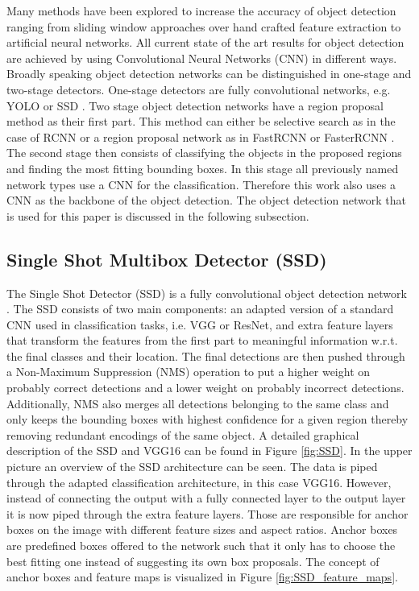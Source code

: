 Many methods have been explored to increase the accuracy of object detection ranging from sliding window approaches over hand crafted feature extraction to artificial neural networks. All current state of the art results for object detection are achieved by using Convolutional Neural Networks (CNN) in different ways. Broadly speaking object detection networks can be distinguished in one-stage and two-stage detectors. One-stage detectors are fully convolutional networks, e.g. YOLO \cite{yolo} or SSD \cite{SSD}. Two stage object detection networks have a region proposal method as their first part. This method can either be selective search as in the case of RCNN \cite{RCNN} or a region proposal network as in FastRCNN \cite{FastRCNN} or FasterRCNN \cite{FasterRCNN}. The second stage then consists of classifying the objects in the proposed regions and finding the most fitting bounding boxes. In this stage all previously named network types use a CNN for the classification. Therefore this work also uses a CNN as the backbone of the object detection. The object detection network that is used for this paper is discussed in the following subsection.

\subsection{Single Shot Multibox Detector (SSD)}

The Single Shot Detector (SSD) is a fully convolutional object detection network \cite{SSD}. The SSD consists of two main components: an adapted version of a standard CNN used in classification tasks, i.e. VGG or ResNet, and extra feature layers that transform the features from the first part to meaningful information w.r.t. the final classes and their location. The final detections are then pushed through a Non-Maximum Suppression (NMS) operation to put a higher weight on probably correct detections and a lower weight on probably incorrect detections. Additionally, NMS also merges all detections belonging to the same class and only keeps the bounding boxes with highest confidence for a given region thereby removing redundant encodings of the same object. 
A detailed graphical description of the SSD and VGG16 can be found in Figure \ref{fig:SSD}. In the upper picture an overview of the SSD architecture can be seen. The data is piped through the adapted classification architecture, in this case VGG16. However, instead of connecting the output with a fully connected layer to the output layer it is now piped through the extra feature layers. Those are responsible for anchor boxes on the image with different feature sizes and aspect ratios. Anchor boxes are predefined boxes offered to the network such that it only has to choose the best fitting one instead of suggesting its own box proposals. The concept of anchor boxes and feature maps is visualized in Figure \ref{fig:SSD_feature_maps}.

